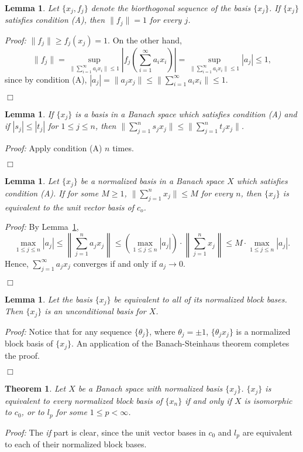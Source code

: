 \documentclass[12pt]{report}
\newcommand\done{\begin{flushright}$\Box$\end{flushright}}
\newtheorem{theorem}[defn]{Theorem}
\newtheorem{lemma}[defn]{Lemma}
\begin{document}
\begin{lemma}
Let $\{x_j, f_j\}$ denote the biorthogonal sequence of the basis $\{x_j\}$.  If $\{x_j\}$
satisfies condition (A), then $\|f_j\|=1$ for every $j$.
\end{lemma}
{\it Proof:}
$\|f_j\| \geq f_j(x_j) = 1.$  On the other hand,
$$
\|f_j\| = \sup_{\|\sum_{i=1}^\infty a_i x_i\| \leq 1} \left|f_j\left(\sum_{i=1}^\infty a_i x_i\right)\right|
= \sup_{\|\sum_{i=1}^\infty a_i x_i\| \leq 1} |a_j| \leq 1,
$$
since by condition (A), $|a_j| = \|a_j x_j\| \leq \|\sum_{i=1}^\infty a_i x_i \| \leq 1$.\done

\begin{lemma}\label{ntimes}
If $\{x_j\}$ is a basis in a Banach space which satisfies condition (A) and if
$|s_j| \leq |t_j|$ for $1\leq j \leq n$, then $\|\sum_{j=1}^n s_j x_j \| \leq
\|\sum_{j=1}^n t_j x_j \|$.
\end{lemma}
{\it Proof:}
Apply condition (A) $n$ times.\done
\pagebreak
\begin{lemma}\label{c_o}
Let $\{x_j\}$ be a normalized basis in a Banach space $X$ which satisfies condition (A).
If for some $M\geq 1$, $\|\sum_{j=1}^n x_j\| \leq M$ for every $n$, then $\{x_j\}$ is
equivalent to the unit vector basis of $c_o$.
\end{lemma}
{\it Proof:}
By Lemma~\ref{ntimes},
$$
\max_{1\leq j \leq n} |a_j| \leq \left\|\sum_{j=1}^n a_j x_j \right\| \leq
\left(\max_{1\leq j\leq n} |a_j| \right)\cdot\left\|\sum_{j=1}^n x_j \right\| \leq
M\cdot\max_{1\leq j\leq n} |a_j|.
$$
Hence, $\sum_{j=1}^\infty a_j x_j$ converges if and only if $a_j \rightarrow 0$.\done

\begin{lemma}\label{uncond}
Let the basis $\{x_j\}$ be equivalent to all of its normalized block bases.  Then $\{x_j\}$ is
an unconditional basis for $X$.
\end{lemma}
{\it Proof:}
Notice that for any sequence $\{\theta_j\}$, where $\theta_j = \pm 1$, $\{\theta_j x_j\}$ is
a normalized block basis of $\{x_j\}$.  An application of the Banach-Steinhaus theorem
completes the proof.\done

\begin{theorem}
Let $X$ be a Banach space with normalized basis $\{x_j\}$.
$\{x_j\}$ is equivalent to every normalized block basis of $\{x_n\}$ if and only if
$X$ is isomorphic to $c_0$, or to $l_p$ for some $1\leq p < \infty$.

\end{theorem}
{\it Proof:}
The {\it if} part is clear, since the unit vector bases in $c_0$ and $l_p$ are
equivalent to each of their normalized block bases.
\end{document}
